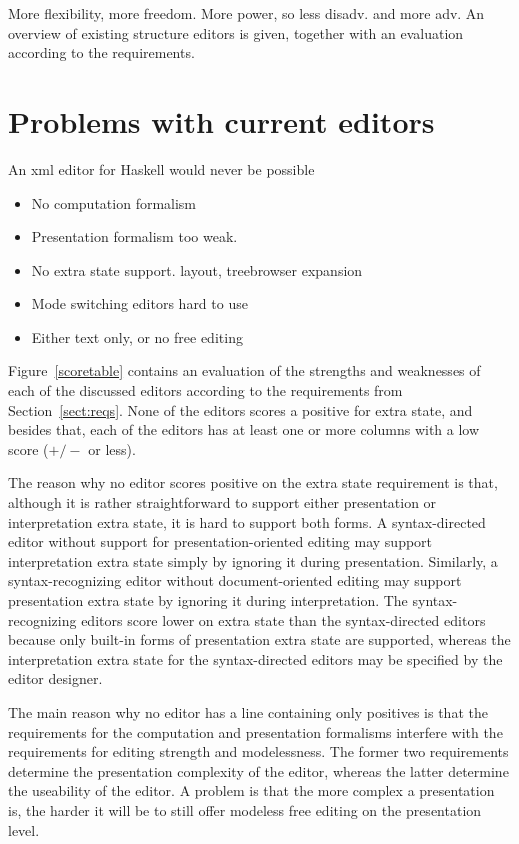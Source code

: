  
\bc
More flexibility, more freedom. More power, so less disadv. and more adv. An overview of existing structure editors is given, together with an evaluation according to the requirements. 

\section{Problems with current editors}
An xml editor for Haskell would never be possible
\begin{itemize}
\item No computation formalism
\item Presentation formalism too weak. 
\item No extra state support. layout, treebrowser expansion
\item Mode switching editors hard to use
\item Either text only, or no free editing
\end{itemize}
\ec

Figure~\ref{scoretable} contains an evaluation of the strengths and weaknesses of each of the discussed editors according to the requirements from Section~\ref{sect:reqs}. None of the editors scores a positive for extra state, and besides that, each of the editors has at least one or more columns with a low score ($+/-$ or less). 

The reason why no editor scores positive on the extra state requirement is that, although it is rather straightforward to support either presentation or interpretation extra state, it is hard to support both forms. A syntax-directed editor without support for presentation-oriented editing may support interpretation extra state simply by ignoring it during presentation. Similarly, a syntax-recognizing editor without document-oriented editing may support presentation extra state by ignoring it during interpretation. The syntax-recognizing editors score lower on extra state than the syntax-directed editors because only built-in forms of presentation extra state are supported, whereas the interpretation extra state for the syntax-directed editors may be specified by the editor designer.

The main reason why no editor has a line containing only positives is that the requirements for the computation and presentation formalisms interfere with the requirements for editing strength and modelessness. The former two requirements determine the presentation complexity of the editor, whereas the latter determine the useability of the editor. A problem is that the more complex a presentation is, the harder it will be to still offer modeless free editing on the presentation level.

